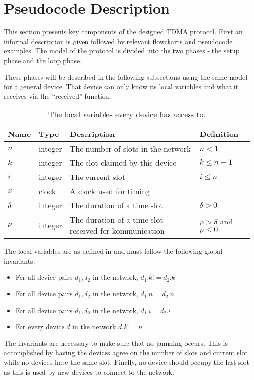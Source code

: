 \section{Pseudocode Description}
This section presents key components of the designed TDMA protocol. 
First an informal description is given followed by relevant flowcharts and pseudocode examples. 
The model of the protocol is divided into the two phases - the setup phase and the loop phase. 

These phases will be described in the following subsections using the same model for a general device. 
That device can only know its local variables and what it receives via the \enquote{received} function.

\begin{table}[H]
	\begin{tabularx}{\textwidth}{l l X l}
		\toprule
		Name		& Type		& Description & Definition\\
		\midrule
		$n$			& integer	& The number of slots in the network & $n < 1$\\
		$k$			& integer	& The slot claimed by this device & $k \leq n - 1$\\
		$i$			& integer	& The current slot & $i \leq n$\\
		$x$			& clock		& A clock used for timing\\
		$\delta$ 	& integer	& The duration of a time slot & $\delta > 0$\\
		$\rho$		& integer	& The duration of a time slot reserved for kommunication & $\rho > \delta$ and $\rho \leq 0$\\
		\bottomrule
	\end{tabularx}
	\caption{The local variables every device has access to.}
	\label{tab:locals}
\end{table}

The local variables are as defined in  and must follow the following global invariants:
\begin{itemize}
\item For all device pairs ${d_1, d_2}$ in the network, $d_1.k != d_2.k$
\item For all device pairs ${d_1, d_2}$ in the network, $d_1.n = d_2.n$
\item For all device pairs ${d_1, d_2}$ in the network, $d_1.i = d_2.i$
\item For every device $d$ in the network $d.k != n$
\end{itemize}

The invariants are necessary to make sure that no jamming occurs. 
This is accomplished by having the devices agree on the number of slots and current slot while no devices have the same slot. 
Finally, no device should occupy the last slot as this is used by new devices to connect to the network.

